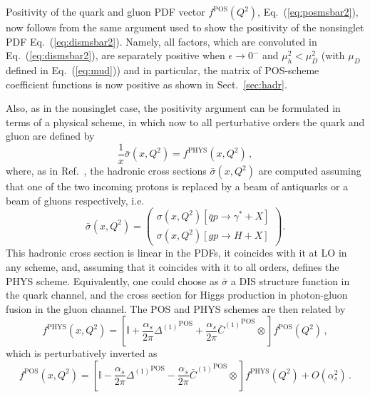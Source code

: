 Positivity of the quark and gluon PDF vector $ f^{{\textrm{POS}}}(Q^2)$,
Eq.~(\ref{eq:posmsbar2}), now follows from the same argument used to
show the positivity of the nonsinglet PDF 
Eq.~(\ref{eq:dismsbar2}). Namely, all
factors, which are convoluted in Eq.~(\ref{eq:dismsbar2}), are 
separately positive when $\epsilon \to 0^-$ and  $\mu_h^2 < \mu_D^2$ (with
$\mu_D$ defined in Eq.~(\ref{eq:mud})) and in particular, the matrix of POS-scheme coefficient
functions is now positive as shown in Sect.~\ref{sec:hadr}.

Also, as in the nonsinglet case,  the positivity argument can be formulated in terms of
a physical scheme, in which now 
to all perturbative orders the quark and gluon are defined by
\begin{equation}\label{eq:phys}
 \frac{1}{x} \bar\sigma(x,Q^2)=f^{\textrm{PHYS}}(x,Q^2) \,,
\end{equation}
where, as in Ref.~\cite{Altarelli:1998gn}, the hadronic cross sections $\bar\sigma(x,Q^2)$ are computed
assuming that one of the two incoming protons is replaced 
by a beam of antiquarks or a beam of gluons respectively, i.e.\ 
\begin{equation}\label{eq:physxsec}
   \bar\sigma(x,Q^2)=\left(\begin{array}{c} \sigma(x,Q^2)[\bar q
       p\to \gamma^*+X]\\ \sigma(x,Q^2)[gp \to H+X]\end{array}\right).
\end{equation}
This hadronic cross section is linear in the PDFs, it coincides with it
at LO in any scheme, and, assuming that it coincides with it to all
orders, defines the PHYS scheme. Equivalently, one could choose as
$\bar \sigma$ a DIS structure function in the quark channel, and the
cross section for Higgs production in photon-gluon fusion in the gluon
channel.
The POS and PHYS schemes are then related by
\begin{equation}\label{eq:postodis}
f^{\textrm{PHYS}}(x,Q^2)=
\left[\mathbb{I}+\frac{\alpha_s}{2\pi} {\Delta^{(1)}}^{\textrm{POS}}
  +\frac{\alpha_s}{2\pi}  {\bar
    C^{(1)}{}}^{\textrm{POS}}\otimes\right]f^{\textrm{POS}}(Q^2) \,,
\end{equation}
which is perturbatively inverted as  
\begin{equation}\label{eq:distopos}
f^{\textrm{POS}}(x,Q^2)=
\left[\mathbb{I}-\frac{\alpha_s}{2\pi} {\Delta^{(1)}}^{\textrm{POS}}
  -\frac{\alpha_s}{2\pi}  {\bar
    C^{(1)}{}}^{\textrm{POS}}\otimes\right]f^{\textrm{PHYS}}(Q^2)+O(\alpha_s^2)\,.
\end{equation}

